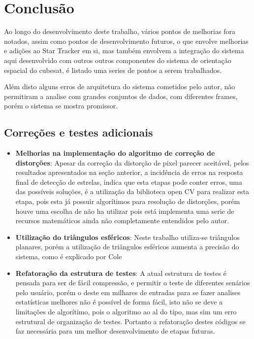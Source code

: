 \chapter*[Conclusão]{Conclusão}
\label{cap:Conclusao_init}


Ao longo do desenvolvimento deste trabalho, vários pontos de melhorias fora notados, 
assim como pontos de desenvolvimento futuros, o que envolve melhorias e adições ao Star Tracker em si, 
mas também envolvem a integração do sistema aqui desenvolvido com outros outros componentes do sistema de orientação espacial do cubesat,
é listado uma series de pontos a serem trabalhados.

Além disto alguns erros de arquitetura do sistema cometidos pelo autor, não permitiram a analise com grandes conjuntos de dados, 
com diferentes frames, porém o sistema se mostra promissor.

\section*{Correções e testes adicionais}
\begin{itemize}
	\item \textbf{Melhorias na implementação do algoritmo de correção de distorções}: Apesar da correção da distorção de pixel parecer aceitável, 
	pelos resultados apresentados na seção anterior, a incidência de erros na resposta final de detecção de estrelas, indica que esta etapas pode conter erros, 
	uma das possíveis soluções, é a utilização da biblioteca open CV para realizar esta etapa, pois esta já possuir algorítimos para resolução de distorções, 
	porém houve uma escolha de não ha utilizar pois está implementa uma serie de recursos matemáticos ainda não completamente entendidos pelo autor. 
	\item \textbf{Utilização do triângulos esféricos}: Neste trabalho utiliza-se triângulos planares, porém a utilização de triângulos esféricos aumenta a precisão do sistema, 
	como é explicado por Cole ~\cite{Cole_2}
	\item \textbf{Refatoração da estrutura de testes}: A atual estrutura de testes é pensada para ser de fácil compressão, 
	e permitir o teste de diferentes senários pelo usuário, porém o deste em milhares de entradas para se fazer analises estatísticas melhores não é possível de forma fácil, 
	isto não se deve a limitações de algorítimo, pois o algoritmo ao al do tipo, mas sim um erro estrutural de organização de testes.
	Portanto a refatoração destes códigos se faz necessária para um melhor desenvolvimento de etapas futuras. 
\end{itemize}

